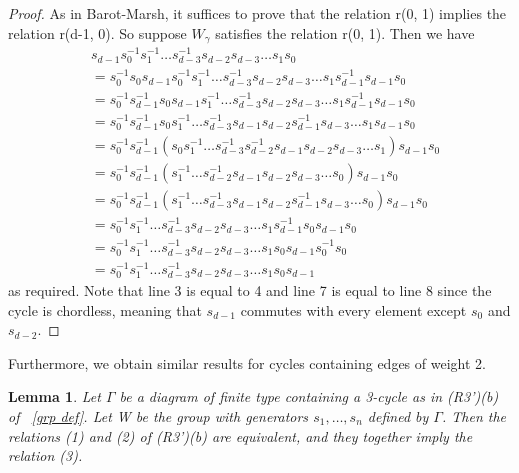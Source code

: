\documentclass[11pt]{amsart}
\newtheorem{lem}[thm]{Lemma}
\theoremstyle{definition}
\begin{document}
\begin{proof}
As in Barot-Marsh, it suffices to prove that the relation r(0, 1) implies the relation r(d-1, 0). So suppose $W_{\gamma}$ satisfies the relation r(0, 1). Then we have 
\begin{align*}
& s_{d-1}s_{0}^{-1}s_{1}^{-1}\dots s_{d-3}^{-1}s_{d-2}s_{d-3}\dots s_1s_0 \\
&= s_{0}^{-1}s_{0}s_{d-1}s_{0}^{-1}s_{1}^{-1}\dots s_{d-3}^{-1}s_{d-2}s_{d-3}\dots s_{1}s_{d-1}^{-1}s_{d-1}s_{0} \\
&= s_{0}^{-1}s_{d-1}^{-1}s_{0}s_{d-1}s_{1}^{-1}\dots s_{d-3}^{-1}s_{d-2}s_{d-3}\dots s_{1}s_{d-1}^{-1}s_{d-1}s_{0} \\
&= s_{0}^{-1}s_{d-1}^{-1}s_{0}s_{1}^{-1}\dots s_{d-3}^{-1}s_{d-1}s_{d-2}s_{d-1}^{-1}s_{d-3}\dots s_{1}s_{d-1}s_{0} \\
&= s_{0}^{-1}s_{d-1}^{-1}(s_{0}s_{1}^{-1}\dots s_{d-3}^{-1}s_{d-2}^{-1}s_{d-1}s_{d-2}s_{d-3}\dots s_{1})s_{d-1}s_{0} \\
&= s_{0}^{-1}s_{d-1}^{-1}(s_{1}^{-1} \dots s_{d-2}^{-1}s_{d-1}s_{d-2}s_{d-3}\dots s_{0})s_{d-1}s_{0} \\
&= s_{0}^{-1}s_{d-1}^{-1}(s_{1}^{-1} \dots s_{d-3}^{-1}s_{d-1}s_{d-2}s_{d-1}^{-1}s_{d-3}\dots s_{0})s_{d-1}s_{0} \\
&= s_{0}^{-1}s_{1}^{-1}\dots s_{d-3}^{-1}s_{d-2}s_{d-3}\dots s_{1}s_{d-1}^{-1}s_{0}s_{d-1}s_{0} \\
&= s_{0}^{-1}s_{1}^{-1}\dots s_{d-3}^{-1}s_{d-2}s_{d-3}\dots s_{1}s_{0}s_{d-1}s_{0}^{-1}s_{0} \\
&= s_{0}^{-1}s_{1}^{-1}\dots s_{d-3}^{-1}s_{d-2}s_{d-3}\dots s_{1}s_{0}s_{d-1} 
\end{align*}
as required. Note that line 3 is equal to 4 and line 7 is equal to line 8 since the cycle is chordless, meaning that $s_{d-1}$ commutes with every element except $s_{0}$ and $s_{d-2}$.
\end{proof}
Furthermore, we obtain similar results for cycles containing edges of weight 2.
\begin{lem} 
Let $\Gamma$ be a diagram of finite type containing a 3-cycle as in (R3')(b) of ~\ref{grp def}. Let W be the group with generators $s_{1}, \dots, s_{n}$ defined by $\Gamma$. Then the relations (1) and (2) of (R3')(b) are equivalent, and they together imply the relation (3).
\end{lem}
\end{document}
